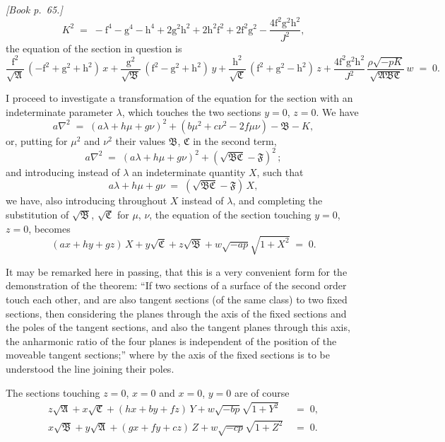 \documentclass[11pt]{article}
\providecommand{\fA}{\mathfrak{A}}
\providecommand{\fB}{\mathfrak{B}}
\providecommand{\fC}{\mathfrak{C}}
\providecommand{\fF}{\mathfrak{F}}
\begin{document}
\bigskip

\noindent\emph{[Book p.~65.]}
\[
K^{2} \;=\; -\mathrm{f}^{4} - \mathrm{g}^{4} - \mathrm{h}^{4} + 2\mathrm{g}^{2}\mathrm{h}^{2} + 2\mathrm{h}^{2}\mathrm{f}^{2} + 2\mathrm{f}^{2}\mathrm{g}^{2} - \frac{4\mathrm{f}^{2}\mathrm{g}^{2}\mathrm{h}^{2}}{J^{2}},
\]
the equation of the section in question is
\[
\frac{\mathrm{f}^{2}}{\sqrt{\fA}}\,(-\mathrm{f}^{2} + \mathrm{g}^{2} + \mathrm{h}^{2})\,x + \frac{\mathrm{g}^{2}}{\sqrt{\fB}}\,(\mathrm{f}^{2} - \mathrm{g}^{2} + \mathrm{h}^{2})\,y + \frac{\mathrm{h}^{2}}{\sqrt{\fC}}\,(\mathrm{f}^{2} + \mathrm{g}^{2} - \mathrm{h}^{2})\,z + \frac{4\mathrm{f}^{2}\mathrm{g}^{2}\mathrm{h}^{2}}{J^{2}}\,\frac{\rho\sqrt{-pK}}{\sqrt{\fA\fB\fC}}\,w \;=\; 0.
\]

I proceed to investigate a transformation of the equation for the section with an indeterminate parameter $\lambda$, which touches the two sections $y = 0$, $z = 0$. We have
\[
a\nabla^{2} \;=\; (a\lambda + h\mu + g\nu)^{2} + (b\mu^{2} + c\nu^{2} - 2f\mu\nu) - \fB - K,
\]
or, putting for $\mu^{2}$ and $\nu^{2}$ their values $\fB$, $\fC$ in the second term,
\[
a\nabla^{2} \;=\; (a\lambda + h\mu + g\nu)^{2} + (\sqrt{\fB\fC} - \fF)^{2}\,;
\]
and introducing instead of $\lambda$ an indeterminate quantity $X$, such that
\[
a\lambda + h\mu + g\nu \;=\; (\sqrt{\fB\fC} - \fF)\,X,
\]
we have, also introducing throughout $X$ instead of $\lambda$, and completing the substitution of $\sqrt{\fB}$, $\sqrt{\fC}$ for $\mu$, $\nu$, the equation of the section touching $y = 0$, $z = 0$, becomes
\[
(ax + hy + gz)\,X + y\sqrt{\fC} + z\sqrt{\fB} + w\sqrt{-ap}\sqrt{1 + X^{2}} \;=\; 0.
\]

It may be remarked here in passing, that this is a very convenient form for the demonstration of the theorem: ``If two sections of a surface of the second order touch each other, and are also tangent sections (of the same class) to two fixed sections, then considering the planes through the axis of the fixed sections and the poles of the tangent sections, and also the tangent planes through this axis, the anharmonic ratio of the four planes is independent of the position of the moveable tangent sections;'' where by the axis of the fixed sections is to be understood the line joining their poles.

The sections touching $z = 0$, $x = 0$ and $x = 0$, $y = 0$ are of course
\begin{align*}
z\sqrt{\fA} + x\sqrt{\fC} + (hx + by + fz)\,Y + w\sqrt{-bp}\sqrt{1 + Y^{2}} &\;=\; 0,\\
x\sqrt{\fB} + y\sqrt{\fA} + (gx + fy + cz)\,Z + w\sqrt{-cp}\sqrt{1 + Z^{2}} &\;=\; 0.
\end{align*}
\end{document}

